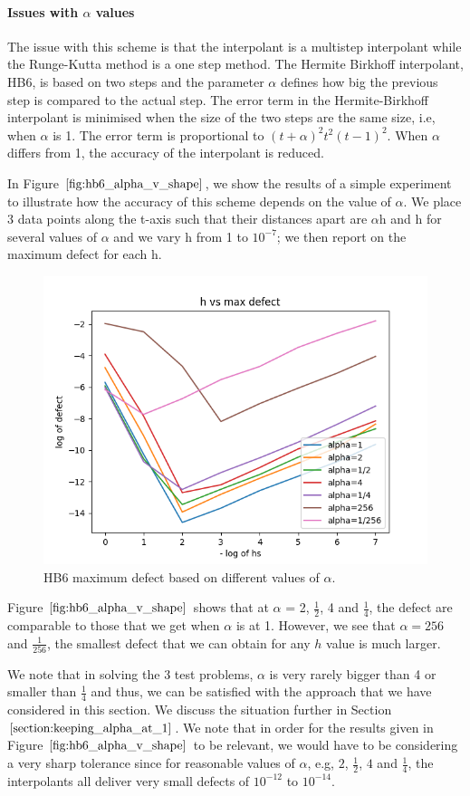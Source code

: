 \paragraph{Issues with $\alpha$ values}
The issue with this scheme is that the interpolant is a multistep interpolant while the Runge-Kutta method is a one step method. The Hermite Birkhoff interpolant, HB6, is based on two steps and the parameter $\alpha$ defines how big the previous step is compared to the actual step. The error term in the Hermite-Birkhoff interpolant is minimised when the size of the two steps are the same size, i.e, when $\alpha$ is 1. The error term is proportional to $(t + \alpha)^2t^2(t - 1)^2$. When $\alpha$ differs from 1, the accuracy of the interpolant is reduced.

In Figure $\ref{fig:hb6_alpha_v_shape}$, we show the results of a simple experiment to illustrate how the accuracy of this scheme depends on the value of $\alpha$. We place 3 data points along the t-axis such that their distances apart are $\alpha$h and h for several values of $\alpha$ and we vary h from 1 to $10^{-7}$; we then report on the maximum defect for each h.

\begin{figure}[H]
\centering
\includegraphics[width=0.7\linewidth]{./figures/hb6_alpha_v_shape}
\caption{HB6 maximum defect based on different values of $\alpha$.}
\label{fig:hb6_alpha_v_shape}
\end{figure}

Figure $\ref{fig:hb6_alpha_v_shape}$ shows that at $\alpha$ = 2, $\frac{1}{2}$, 4 and $\frac{1}{4}$, the defect are comparable to those that we get when $\alpha$ is at 1. However, we see that $\alpha = 256$ and $\frac{1}{256}$, the smallest defect that we can obtain for any $h$ value is much larger.

We note that in solving the 3 test problems, $\alpha$ is very rarely bigger than 4 or smaller than $\frac{1}{4}$ and thus, we can be satisfied with the approach that we have considered in this section. We discuss the situation further in Section $\ref{section:keeping_alpha_at_1}$. We note that in order for the results given in Figure $\ref{fig:hb6_alpha_v_shape}$ to be relevant, we would have to be considering a very sharp tolerance since for reasonable values of $\alpha$, e.g, $2$, $\frac{1}{2}$, $4$ and $\frac{1}{4}$, the interpolants all deliver very small defects of $10^{-12}$ to $10^{-14}$.

